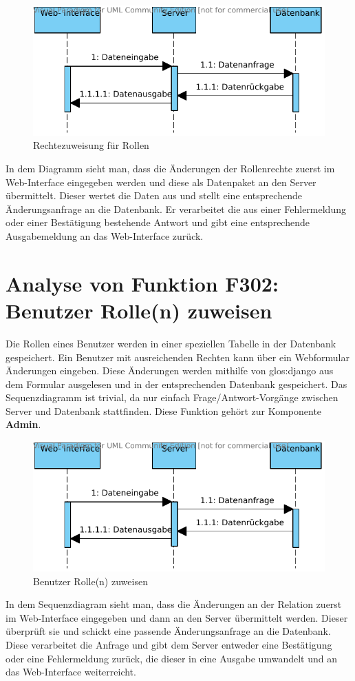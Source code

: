 \begin{figure}[h]
\includegraphics[width=0.8\linewidth]{bilder/f300.pdf}
\caption[Rechtezuweisung für Rollen]{Rechtezuweisung für Rollen}
\label{fig:301}
\end{figure}

In dem Diagramm sieht man, dass die Änderungen der Rollenrechte zuerst im
Web-Interface eingegeben werden und diese als Datenpaket an den Server
übermittelt. Dieser wertet die Daten aus und stellt eine entsprechende
Änderungsanfrage an die Datenbank. Er verarbeitet die aus einer Fehlermeldung
oder einer Bestätigung bestehende Antwort und gibt eine entsprechende
Ausgabemeldung an das Web-Interface zurück.

\section{Analyse von Funktion F302: Benutzer Rolle(n) zuweisen}
Die Rollen eines Benutzer werden in einer speziellen Tabelle in der Datenbank gespeichert. Ein Benutzer mit ausreichenden Rechten kann über ein Webformular Änderungen eingeben. Diese Änderungen werden mithilfe von \gls{glos:django} aus dem Formular ausgelesen und in der entsprechenden Datenbank gespeichert. Das Sequenzdiagramm ist trivial, da nur einfach Frage/Antwort-Vorgänge zwischen Server und Datenbank stattfinden. Diese Funktion gehört zur Komponente \textbf{Admin}.

\begin{figure}[h]
\includegraphics[width=0.8\linewidth]{bilder/f302.pdf}
\caption[Benutzer Rolle(n) zuweisen]{Benutzer Rolle(n) zuweisen}
\label{fig:302}
\end{figure}

In dem Sequenzdiagram sieht man, dass die Änderungen an der Relation zuerst im
Web-Interface eingegeben und dann an den Server übermittelt werden. Dieser
überprüft sie und schickt eine passende Änderungsanfrage an die Datenbank.
Diese verarbeitet die Anfrage und gibt dem Server entweder eine Bestätigung
oder eine Fehlermeldung zurück, die dieser in eine Ausgabe umwandelt und an das
Web-Interface weiterreicht.
